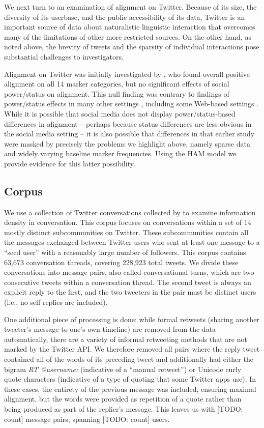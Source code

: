 \documentclass{acm_proc_article-sp}
\begin{document}
We next turn to an examination of alignment on Twitter. Because of its size, the diversity of its userbase, and the public accessibility of its data, Twitter is an important source of data about naturalistic linguistic interaction that overcomes many of the limitations of other more restricted sources. On the other hand, as noted above, the brevity of tweets and the sparsity of individual interactions pose substantial challenges to investigators. 

Alignment on Twitter was initially investigated by \cite{DNMGamonDumais2011}, who found overall positive alignment on all 14 marker categories, but no significant effects of social power/status on alignment. This null finding was contrary to findings of power/status effects in many other settings \cite{Gnisci2005}, including some Web-based settings \cite{DNMEtAl2012,NobleFernandez2015}. While it is possible that social media does not display power/status-based differences in alignment -- perhaps because status differences are less obvious in the social media setting -- it is also possible that differences in that earlier study were masked by precisely the problems we highlight above, namely sparse data and widely varying baseline marker frequencies. Using the HAM model we provide evidence for this latter possibility.

\subsection{Corpus}

We use a collection of Twitter conversations collected by \cite{DoyleFrank2015CMCL} to examine information density in conversation. This corpus focuses on conversations within a set of 14 mostly distinct subcommunities on Twitter.  These subcommunities contain all the messages exchanged between Twitter users who sent at least one message to a ``seed user'' with a reasonably large number of followers. This corpus contains 63,673 conversation threads, covering 228,923 total tweets.  We divide these conversations into message pairs, also called conversational turns, which are two consecutive tweets within a conversation thread.  The second tweet is always an explicit reply to the first, and the two tweeters in the pair must be distinct users (i.e., no self replies are included).  

One additional piece of processing is done: while formal retweets (sharing another tweeter's message to one's own timeline) are removed from the data automatically, there are a variety of informal retweeting methods that are not marked by the Twitter API.  We therefore removed all pairs where the reply tweet contained all of the words of its preceding tweet and additionally had either the bigram \textit{RT @username:} (indicative of a ``manual retweet'') or Unicode curly quote characters (indicative of a type of quoting that some Twitter apps use).  In these cases, the entirety of the previous message was included, ensuring maximal alignment, but the words were provided as repetition of a quote rather than being produced as part of the replier's message.  This leaves us with [TODO: count] message pairs, spanning [TODO: count] users.
\end{document}
